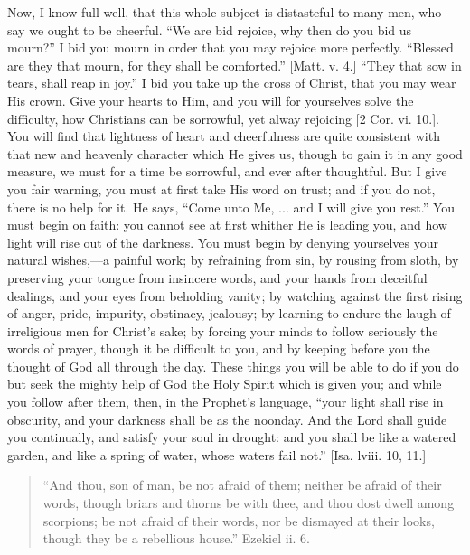 Now, I know full well, that this whole subject is distasteful to
many men, who say we ought to be cheerful. ``We are bid rejoice,
why then do you bid us mourn?'' I bid you mourn in order that you
may rejoice more perfectly. ``Blessed are they that mourn, for
they shall be comforted.'' [Matt. v. 4.] ``They that sow in
tears, shall reap in joy.'' I bid you take up the cross of Christ,
that you may wear His crown. Give your hearts to Him, and you will for
yourselves solve the difficulty, how Christians can be sorrowful, yet
alway rejoicing [2 Cor. vi. 10.]. You will find that lightness of
heart and cheerfulness are quite consistent with that new and heavenly
character which He gives us, though to gain it in any good measure, we
must for a time be sorrowful, and ever after thoughtful. But I give
you fair warning, you must at first take His word on trust; and if you
do not, there is no help for it. He says, ``Come unto Me, ... and
I will give you rest.'' You must begin on faith: you cannot see at
first whither He is leading you, and how light will rise out of the
darkness. You must begin by denying yourselves your natural wishes,—a
painful work; by refraining from sin, by rousing from sloth, by
preserving your tongue from insincere words, and your hands from
deceitful dealings, and your eyes from beholding vanity; by watching
against the first rising of anger, pride, impurity, obstinacy,
jealousy; by learning to endure the laugh of irreligious men for
Christ's sake; by forcing your minds to follow seriously the words of
prayer, though it be difficult to you, and by keeping before you the
thought of God all through the day. These things you will be able to
do if you do but seek the mighty help of God the Holy Spirit which is
given you; and while you follow after them, then, in the Prophet's
language, ``your light shall rise in obscurity, and your darkness
shall be as the noonday. And the Lord shall guide you continually, and
satisfy your soul in drought: and you shall be like a watered garden,
and like a spring of water, whose waters fail not.'' [Isa. lviii.
10, 11.]


\begin{quote}

``And thou, son of man, be not afraid of them; neither be
afraid of their words, though briars and thorns be with thee, and
thou dost dwell among scorpions; be not afraid of their words, nor
be dismayed at their looks, though they be a rebellious house.''
Ezekiel ii. 6.

\end{quote}

